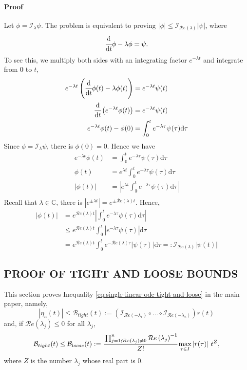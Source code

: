 \documentclass[accepted]{uai2023}
\newcommand{\dt}[1]{\cfrac{\mathrm{d} #1}{\mathrm{d} t}}
\newcommand{\Err}{\eta}
\newcommand{\Bound}{\mathcal{B}}
\newcommand{\I}{\mathcal{I}}
\renewcommand{\Re}[1]{\mathcal{R}e\left(#1\right)}
\begin{document}
    \paragraph{Proof} 
    Let $\phi = \I_\lambda \psi$. The problem is equivalent to proving $|\phi| \leq \I_{\Re{\lambda}}|\psi|$, where
    \begin{equation}
        \dt{}\phi-\lambda\phi = \psi.
    \end{equation}
    To see this, we multiply both sides with an integrating factor $e^{-\lambda t}$ and integrate from $0$ to $t$,
    \begin{align}
        e^{-\lambda t} \left(\dt{}\phi(t)-\lambda\phi(t)\right) &= e^{-\lambda t}\psi(t) \\
        \dt{}\left(e^{-\lambda t}\phi(t)\right) &= e^{-\lambda t}\psi(t) \\
        e^{-\lambda t}\phi(t) - \phi(0) &= \int_{0}^{t} e^{-\lambda \tau}\psi(\tau) \mathrm{d}\tau
    \end{align}
    Since $\phi = \I_{\lambda} \psi$, there is $\phi(0) = 0$. Hence we have
    \begin{align}
        e^{-\lambda t}\phi(t) &= \int_{0}^{t} e^{-\lambda \tau}\psi(\tau) \mathrm{d}\tau \\
        \phi(t) &= e^{\lambda t}\int_{0}^{t} e^{-\lambda \tau}\psi(\tau) \mathrm{d}\tau \\
        |\phi(t)| &= \left|e^{\lambda t}\int_{0}^{t} e^{-\lambda \tau}\psi(\tau) \mathrm{d}\tau\right| \\
    \end{align}
    Recall that $\lambda \in \mathbb{C}$, there is $\left|e^{\pm \lambda t}\right| = e^{\pm \Re{\lambda} t}$. 
    Hence,
    \begin{align}
        |\phi(t)| &= e^{\Re{\lambda} t} \left|\int_{0}^{t} e^{-\lambda \tau}\psi(\tau) \mathrm{d}\tau \right| \\
        &\leq e^{\Re{\lambda} t} \int_{0}^{t} \left|e^{-\lambda \tau}\psi(\tau) \right|\mathrm{d}\tau  \\
        &=e^{\Re{\lambda} t} \int_{0}^{t} e^{-\Re{\lambda} \tau}|\psi(\tau)|\mathrm{d}\tau =: \I_{\Re{\lambda}}|\psi(t)|
    \end{align}

\subsection{PROOF OF TIGHT AND LOOSE BOUNDS}
This section proves Inequality \ref{eq:single-linear-ode-tight-and-loose} in the main paper, namely,
\begin{equation}\label{eq:tight-bound-to-prove}
    |\Err_{u}(t)| \leq \Bound_{tight}(t) :=\left(\I_{\Re{-\lambda_1}}\circ\dots\circ\I_{\Re{-\lambda_n}}\right)r(t)
\end{equation}
and, if $\Re{\lambda_j} \leq 0$ for all $\lambda_j$, 
\begin{equation}\label{eq:loose-bound-to-prove}
    \Bound_{tight}(t) \leq \Bound_{loose}(t) := \cfrac{\prod_{j=1; \Re{\lambda_j} \neq 0}^n \Re{\lambda_j}^{-1} }{Z!} \max_{\tau\in I}\left|r(\tau)\right|\, t^{Z},
\end{equation}
where $Z$ is the number $\lambda_j$ whose real part is $0$.
\end{document}
